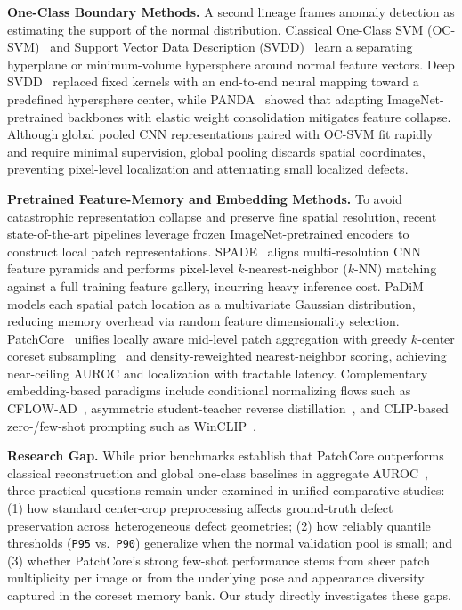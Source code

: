 \documentclass[conference]{IEEEtran}
\begin{document}
\textbf{One-Class Boundary Methods.} A second lineage frames anomaly detection as estimating the support of the normal distribution. Classical One-Class SVM (OC-SVM)~\cite{scholkopf2001estimating} and Support Vector Data Description (SVDD)~\cite{tax2004support} learn a separating hyperplane or minimum-volume hypersphere around normal feature vectors. Deep SVDD~\cite{ruff2018deep} replaced fixed kernels with an end-to-end neural mapping toward a predefined hypersphere center, while PANDA~\cite{reiss2021panda} showed that adapting ImageNet-pretrained backbones with elastic weight consolidation mitigates feature collapse. Although global pooled CNN representations paired with OC-SVM fit rapidly and require minimal supervision, global pooling discards spatial coordinates, preventing pixel-level localization and attenuating small localized defects.

\textbf{Pretrained Feature-Memory and Embedding Methods.} To avoid catastrophic representation collapse and preserve fine spatial resolution, recent state-of-the-art pipelines leverage frozen ImageNet-pretrained encoders to construct local patch representations. SPADE~\cite{cohen2020sub} aligns multi-resolution CNN feature pyramids and performs pixel-level $k$-nearest-neighbor ($k$-NN) matching against a full training feature gallery, incurring heavy inference cost. PaDiM~\cite{defard2021padim} models each spatial patch location as a multivariate Gaussian distribution, reducing memory overhead via random feature dimensionality selection. PatchCore~\cite{roth2022towards} unifies locally aware mid-level patch aggregation with greedy $k$-center coreset subsampling~\cite{sener2018active} and density-reweighted nearest-neighbor scoring, achieving near-ceiling AUROC and localization with tractable latency. Complementary embedding-based paradigms include conditional normalizing flows such as CFLOW-AD~\cite{gudovskiy2022cflow}, asymmetric student-teacher reverse distillation~\cite{deng2022anomaly}, and CLIP-based zero-/few-shot prompting such as WinCLIP~\cite{jeong2023winclip}.

\textbf{Research Gap.} While prior benchmarks establish that PatchCore outperforms classical reconstruction and global one-class baselines in aggregate AUROC~\cite{roth2022towards}, three practical questions remain under-examined in unified comparative studies: (1) how standard center-crop preprocessing affects ground-truth defect preservation across heterogeneous defect geometries; (2) how reliably quantile thresholds (\texttt{P95} vs.\ \texttt{P90}) generalize when the normal validation pool is small; and (3) whether PatchCore's strong few-shot performance stems from sheer patch multiplicity per image or from the underlying pose and appearance diversity captured in the coreset memory bank. Our study directly investigates these gaps.
\end{document}
